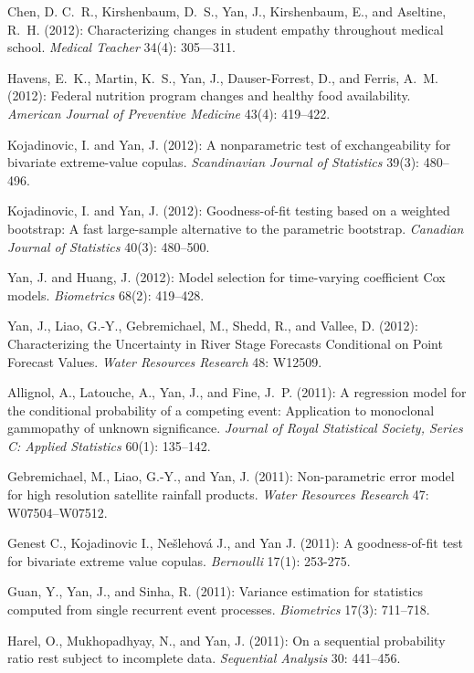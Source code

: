 \documentclass[Statistics]{vita}
\begin{document}
\begin{vita}
\begin{Publications}
\begin{RefereedJournalArticles}
  \item Chen, D. C.~R., Kirshenbaum, D.~S., Yan, J., Kirshenbaum, E., and Aseltine,  R.~H. (2012): Characterizing changes in student empathy throughout medical school. {\em Medical Teacher\/} 34(4): 305--–311.
  \item Havens, E.~K., Martin, K.~S., Yan, J., Dauser-Forrest, D., and Ferris, A.~M. (2012): Federal nutrition program changes and healthy food availability. {\em  American Journal of Preventive Medicine\/} 43(4): 419--422.
  \item Kojadinovic, I. and Yan, J. (2012): A nonparametric test of exchangeability for bivariate extreme-value copulas. {\em Scandinavian Journal of Statistics\/} 39(3): 480--496.
  \item Kojadinovic, I. and Yan, J. (2012): Goodness-of-fit testing based on a weighted bootstrap: A fast large-sample alternative to the parametric bootstrap. {\em Canadian Journal of Statistics\/} 40(3): 480--500.
  \item Yan, J. and Huang, J. (2012): Model selection for time-varying coefficient Cox models. {\em Biometrics\/} 68(2): 419--428.
  \item Yan, J., Liao, G.-Y., Gebremichael, M., Shedd, R., and Vallee, D. (2012): Characterizing the Uncertainty in River Stage Forecasts Conditional on Point Forecast Values. {\em Water Resources Research\/} 48: W12509.
  \item Allignol, A., Latouche, A., Yan, J., and Fine, J.~P. (2011):  A regression model for the conditional probability of a competing event: {A}pplication to monoclonal gammopathy of unknown significance. {\em Journal of Royal Statistical Society, Series C: Applied Statistics\/}  60(1): 135--142.
  \item Gebremichael, M., Liao, G.-Y., and Yan, J. (2011): Non-parametric error model for high resolution satellite rainfall products. {\em Water Resources Research\/} 47: W07504--W07512.
  \item Genest C., Kojadinovic I., Ne\v{s}lehov\'a J., and Yan J. (2011): A goodness-of-fit test for bivariate extreme value copulas. {\em Bernoulli\/} 17(1): 253-275.
  \item Guan, Y., Yan, J., and Sinha, R. (2011): Variance estimation for statistics computed from single recurrent event processes. {\em Biometrics\/} 17(3): 711--718.
  \item Harel, O., Mukhopadhyay, N., and Yan, J. (2011): On a sequential probability ratio rest subject to incomplete data. {\em Sequential Analysis\/} 30: 441--456.

\end{RefereedJournalArticles}
\end{Publications}
\end{vita}
\end{document}
